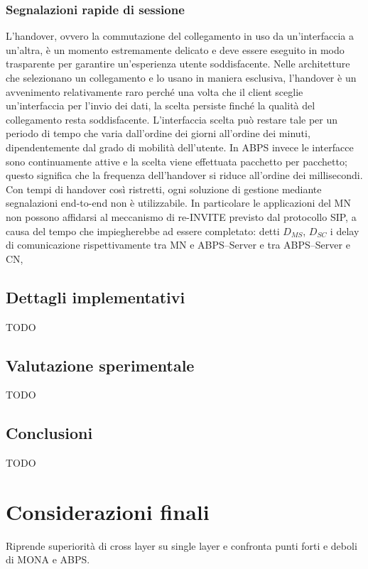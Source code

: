 \documentclass[12pt,a4paper,openright,twoside]{book}
\begin{document}
\subsection{Segnalazioni rapide di sessione}
L'handover, ovvero la commutazione del collegamento in uso da
un'interfaccia a un'altra, è un momento estremamente delicato e deve
essere eseguito in modo trasparente per garantire un'esperienza utente
soddisfacente. Nelle architetture che selezionano un collegamento e lo
usano in maniera esclusiva, l'handover è un avvenimento relativamente
raro perché una volta che il client sceglie un'interfaccia per l'invio
dei dati, la scelta persiste finché la qualità del collegamento resta
soddisfacente. L'interfaccia scelta può restare tale per un periodo di
tempo che varia dall'ordine dei giorni all'ordine dei minuti,
dipendentemente dal grado di mobilità dell'utente. In ABPS invece le
interfacce sono continuamente attive e la scelta viene effettuata
pacchetto per pacchetto; questo significa che la frequenza
dell'handover si riduce all'ordine dei millisecondi. Con tempi di
handover così ristretti, ogni soluzione di gestione mediante
segnalazioni end-to-end non è utilizzabile. In particolare le
applicazioni del MN non possono affidarsi al meccanismo di re-INVITE
previsto dal protocollo SIP, a causa del tempo che impiegherebbe ad
essere completato: detti $D_{MS}$, $D_{SC}$ i delay di comunicazione
rispettivamente tra MN e ABPS--Server e tra ABPS--Server e CN,

\section{Dettagli implementativi}

TODO

\section{Valutazione sperimentale}

TODO

\section{Conclusioni}

TODO

\clearpage{\pagestyle{empty}\cleardoublepage}


\chapter{Considerazioni finali}
Riprende superiorità di cross layer su single layer e confronta punti
forti e deboli di MONA e ABPS.
\end{document}
